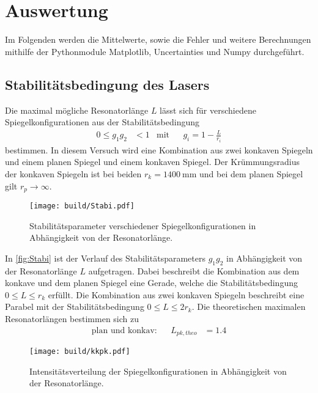 \section{Auswertung}
\label{sec:Auswertung}

Im Folgenden werden die Mittelwerte, sowie die Fehler und weitere Berechnungen mithilfe der Pythonmodule Matplotlib\cite{matplotlib},
Uncertainties\cite{uncertainties} und Numpy\cite{numpy} durchgeführt.

\subsection{Stabilitätsbedingung des Lasers}
\label{subsec:Stabilitätsbedingung}
Die maximal mögliche Resonatorlänge $L$ lässt sich für verschiedene Spiegelkonfigurationen aus der Stabilitätsbedingung
\begin{align*}
  0 \leq g_1 g_2 &< 1 & \text{mit}& & g_i = 1 - \frac{L}{r_i}
\end{align*}
bestimmen. In diesem Versuch wird eine Kombination aus zwei konkaven Spiegeln und einem planen Spiegel und einem konkaven Spiegel.
Der Krümmungsradius der konkaven Spiegeln ist bei beiden $r_k = \qty{1400}{\milli\meter}$ und bei dem planen Spiegel gilt $r_p \to \infty$.

\begin{figure}[H]
  \centering
  \texttt{[image: build/Stabi.pdf]}
  \caption {Stabilitätsparameter verschiedener Spiegelkonfigurationen in Abhängigkeit von der Resonatorlänge.}
  \label{fig:Stabi}
\end{figure}

In \autoref{fig:Stabi} ist der Verlauf des Stabilitätsparameters $g_1 g_2$ in Abhängigkeit von der Resonatorlänge $L$ aufgetragen. Dabei beschreibt die
Kombination aus dem konkave und dem planen Spiegel eine Gerade, welche die Stabilitätsbedingung $0 \leq L \leq r_k$ erfüllt. Die Kombination aus zwei konkaven Spiegeln
beschreibt eine Parabel mit der Stabilitätsbedingung $0 \leq L \leq 2 r_k$.
Die theoretischen maximalen Resonatorlängen bestimmen sich zu
\begin{align}
  \text{plan und konkav:} && L_{pk,theo} &= 1.4
\end{align}

\begin{figure}[H]
  \centering
  \texttt{[image: build/kkpk.pdf]}
  \caption {Intensitätsverteilung der Spiegelkonfigurationen in Abhängigkeit von der Resonatorlänge.}
  \label{fig:kkpk}
\end{figure}

